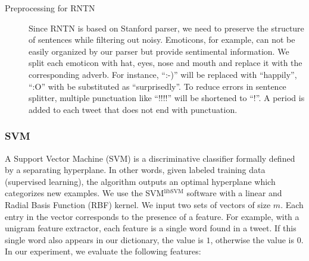 \begin{description}
\item[Preprocessing for RNTN] Since RNTN is based on Stanford parser, we need to preserve the structure of sentences while filtering out noisy. 
 Emoticons, for example, can not be easily organized by our parser but provide sentimental information. We split each emoticon with hat, eyes, nose and mouth and replace it with the corresponding adverb. For instance, ``:-)'' will be replaced with ``happily'', ``:O'' with be substituted as ``surprisedly''.  To reduce errors in sentence splitter, multiple punctuation like ``!!!!'' will be shortened to ``!''.  A period is added to each tweet that does not end with punctuation.


\end{description}


\subsubsection{SVM}
\label{svm}
A Support Vector Machine (SVM) is a discriminative classifier formally defined by a separating hyperplane. In other words, given labeled training data (supervised learning), the algorithm outputs an optimal hyperplane which categorizes new examples. We use the SVM$^{\text{libSVM}}$ software with a linear and Radial Basis Function (RBF) kernel. We input two sets of vectors of size $m$. Each entry in the vector corresponds to the presence of a feature. For example, with a unigram feature extractor, each feature is a single word found in a tweet. If this single word also appears in our dictionary, the value is $1$, otherwise the value is $0$. In our experiment, we evaluate the following features:
